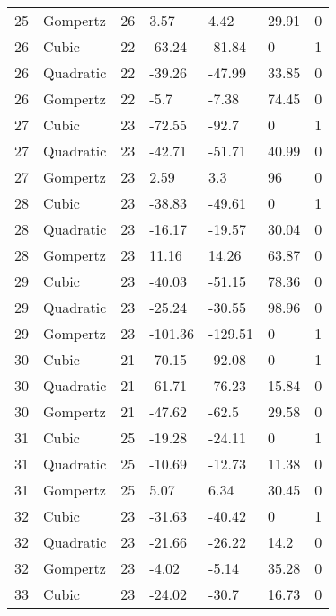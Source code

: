 \documentclass[11pt]{article}
\begin{document}
\begin{center}
\begin{longtable}{lllllll}
    25  & Gompertz  & 26              & 3.57    & 4.42    & 29.91   & 0    \\
    26  & Cubic     & 22              & -63.24  & -81.84  & 0       & 1    \\
    26  & Quadratic & 22              & -39.26  & -47.99  & 33.85   & 0    \\
    26  & Gompertz  & 22              & -5.7    & -7.38   & 74.45   & 0    \\
    27  & Cubic     & 23              & -72.55  & -92.7   & 0       & 1    \\
    27  & Quadratic & 23              & -42.71  & -51.71  & 40.99   & 0    \\
    27  & Gompertz  & 23              & 2.59    & 3.3     & 96      & 0    \\
    28  & Cubic     & 23              & -38.83  & -49.61  & 0       & 1    \\
    28  & Quadratic & 23              & -16.17  & -19.57  & 30.04   & 0    \\
    28  & Gompertz  & 23              & 11.16   & 14.26   & 63.87   & 0    \\
    29  & Cubic     & 23              & -40.03  & -51.15  & 78.36   & 0    \\
    29  & Quadratic & 23              & -25.24  & -30.55  & 98.96   & 0    \\
    29  & Gompertz  & 23              & -101.36 & -129.51 & 0       & 1    \\
    30  & Cubic     & 21              & -70.15  & -92.08  & 0       & 1    \\
    30  & Quadratic & 21              & -61.71  & -76.23  & 15.84   & 0    \\
    30  & Gompertz  & 21              & -47.62  & -62.5   & 29.58   & 0    \\
    31  & Cubic     & 25              & -19.28  & -24.11  & 0       & 1    \\
    31  & Quadratic & 25              & -10.69  & -12.73  & 11.38   & 0    \\
    31  & Gompertz  & 25              & 5.07    & 6.34    & 30.45   & 0    \\
    32  & Cubic     & 23              & -31.63  & -40.42  & 0       & 1    \\
    32  & Quadratic & 23              & -21.66  & -26.22  & 14.2    & 0    \\
    32  & Gompertz  & 23              & -4.02   & -5.14   & 35.28   & 0    \\
    33  & Cubic     & 23              & -24.02  & -30.7   & 16.73   & 0    \\

\end{longtable}
\end{center}
\end{document}
